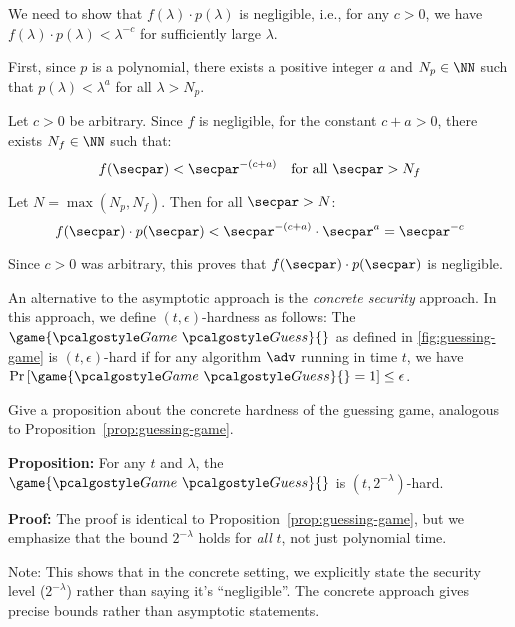 \ifsolutions
\begin{mysolution}
  We need to show that $f(\lambda) \cdot p(\lambda)$ is negligible, i.e., for any $c > 0$, we have $f(\lambda) \cdot p(\lambda) < \lambda^{-c}$ for sufficiently large $\lambda$.
  
  First, since $p$ is a polynomial, there exists a positive integer $a$ and $N_p \in \NN$ such that $p(\lambda) < \lambda^{a}$ for all $\lambda > N_p$.
  
  Let $c > 0$ be arbitrary. Since $f$ is negligible, for the constant $c + a > 0$, there exists $N_f \in \NN$ such that:
  \[
  f(\secpar) < \secpar^{-(c+a)} \quad \text{for all } \secpar > N_f
  \]
  
  Let $N = \max(N_p, N_f)$. Then for all $\secpar > N$:
  \[
  f(\secpar) \cdot p(\secpar) < \secpar^{-(c+a)} \cdot \secpar^{a} = \secpar^{-c}
  \]
  
  Since $c > 0$ was arbitrary, this proves that $f(\secpar) \cdot p(\secpar)$ is negligible.
\end{mysolution}
\fi

\begin{exercise}[Optional]\label{ex:concrete-security}
  An alternative to the asymptotic approach is the \emph{concrete security} approach.
  In this approach, we define $(t,\epsilon)$-hardness as follows:
  The $\game{\Game~\algo{Guess}}{}$ as defined in \autoref{fig:guessing-game} is $(t,\epsilon)$-hard if for any algorithm $\adv$ running in time $t$, we have $\pr{\game{\Game~\algo{Guess}}{} = 1} \le \epsilon$.
  
  Give a proposition about the concrete hardness of the guessing game, analogous to Proposition~\ref{prop:guessing-game}.
\end{exercise}

\ifsolutions
\begin{mysolution}
  \textbf{Proposition:} For any $t$ and $\lambda$, the $\game{\Game~\algo{Guess}}{}$ is $(t, 2^{-\lambda})$-hard.
  
  \textbf{Proof:} The proof is identical to Proposition~\ref{prop:guessing-game}, but we emphasize that the bound $2^{-\lambda}$ holds for \emph{all} $t$, not just polynomial time.
  
  Note: This shows that in the concrete setting, we explicitly state the security level ($2^{-\lambda}$) rather than saying it's ``negligible''.
  The concrete approach gives precise bounds rather than asymptotic statements.
\end{mysolution}
\fi

